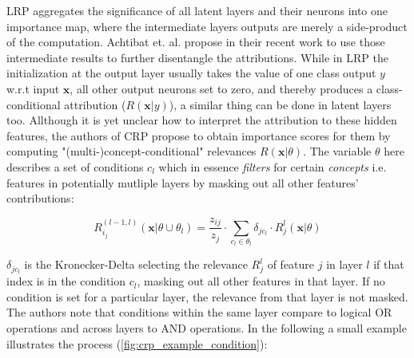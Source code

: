 LRP aggregates the significance of all latent layers and their neurons into one importance map, where the intermediate layers outputs are merely a side-product of the computation.
Achtibat et. al. propose in their recent work \cite{Achtibat2022} to use those intermediate results to further disentangle the attributions. While in LRP the initialization at the output layer usually takes the value of one class output $y$ w.r.t input $\mathbf{x}$, all other output neurons set to zero, and thereby produces a class-conditional attribution ($R(\mathbf{x}|y)$), a similar thing can be done in latent layers too. Allthough it is yet unclear how to interpret the attribution to these hidden features, the authors of CRP propose to obtain importance scores for them by computing "(multi-)concept-conditional" relevances $R(\mathbf{x}|\theta)$. The variable $\theta$ here describes a set of conditions $c_l$ which in essence \textit{filters} for certain \textit{concepts} i.e. features in potentially mutliple layers by masking out all other features' contributions:

\begin{equation}
    R^{(l-1, l)}_{i_j} (\mathbf{x} | \theta \cup \theta_l) = \frac{z_{ij}}{z_j} \cdot \sum_{c_l \in \theta_l} \delta_{jc_l} \cdot R^{l}_j (\mathbf{x} | \theta )
\end{equation}

$\delta_{jc_l}$ is the Kronecker-Delta selecting the relevance $R^l_j$ of feature $j$ in layer $l$ if that index is in the condition $c_l$, masking out all other features in that layer. If no condition is set for a particular layer, the relevance from that layer is not masked. The authors note that conditions within the same layer compare to logical OR operations and across layers to AND operations. In the following a small example illustrates the process (\autoref{fig:crp_example_condition}):


